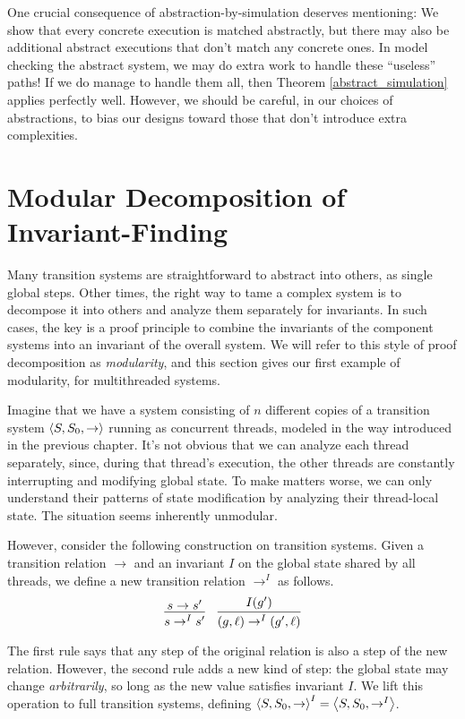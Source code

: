 \documentclass{amsbook}
\theoremstyle{definition}
\theoremstyle{remark}
\numberwithin{section}{chapter}
\numberwithin{equation}{chapter}
\begin{document}
One crucial consequence of abstraction-by-simulation deserves mentioning:
We show that every concrete execution is matched abstractly, but there may also be additional abstract executions that don't match any concrete ones.
In model checking the abstract system, we may do extra work to handle these ``useless'' paths!
If we do manage to handle them all, then Theorem \ref{abstract_simulation} applies perfectly well.
However, we should be careful, in our choices of abstractions, to bias our designs toward those that don't introduce extra complexities.


\section{Modular Decomposition of Invariant-Finding}

Many transition systems are straightforward to abstract into others, as single global steps.
Other times, the right way to tame a complex system is to decompose it into others and analyze them separately for invariants.
In such cases, the key is a proof principle to combine the invariants of the component systems into an invariant of the overall system.
We will refer to this style of proof decomposition as \emph{modularity}, and this section gives our first example of modularity, for multithreaded systems.

Imagine that we have a system consisting of $n$ different copies of a transition system ${\left \langle S, S_0, \to \right \rangle}$ running as concurrent threads, modeled in the way introduced in the previous chapter.
It's not obvious that we can analyze each thread separately, since, during that thread's execution, the other threads are constantly interrupting and modifying global state.
To make matters worse, we can only understand their patterns of state modification by analyzing their thread-local state.
The situation seems inherently unmodular.

However, consider the following construction on transition systems.
Given a transition relation $\to$ and an invariant $I$ on the global state shared by all threads, we define a new transition relation $\to^I$ as follows.
$$\infer{s \to^I s'}{
  s \to s'
}
\quad \infer{(g, \ell) \to^I (g', \ell)}{
  I(g')
}$$

The first rule says that any step of the original relation is also a step of the new relation.
However, the second rule adds a new kind of step: the global state may change \emph{arbitrarily}, so long as the new value satisfies invariant $I$.
We lift this operation to full transition systems, defining ${\left \langle S, S_0, \to \right \rangle}^I = {\left \langle S, S_0, \to^I \right \rangle}$.
\end{document}
